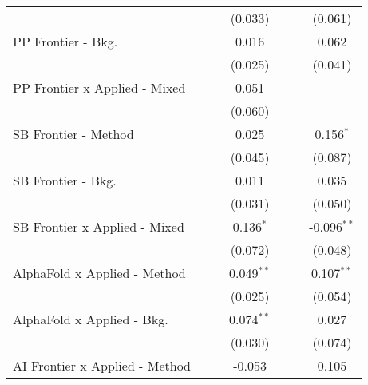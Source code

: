 \begin{tabular}{lcccccc}
                                  &               &               & (0.033)       &               &         & (0.061)\\   
   PP Frontier - Bkg.             &               &               & 0.016         &               &         & 0.062\\   
                                  &               &               & (0.025)       &               &         & (0.041)\\   
   PP Frontier x Applied - Mixed  &               &               & 0.051         &               &         &   \\   
                                  &               &               & (0.060)       &               &         &   \\   
   SB Frontier - Method           &               &               & 0.025         &               &         & 0.156$^{*}$\\   
                                  &               &               & (0.045)       &               &         & (0.087)\\   
   SB Frontier - Bkg.             &               &               & 0.011         &               &         & 0.035\\   
                                  &               &               & (0.031)       &               &         & (0.050)\\   
   SB Frontier x Applied - Mixed  &               &               & 0.136$^{*}$   &               &         & -0.096$^{**}$\\   
                                  &               &               & (0.072)       &               &         & (0.048)\\   
   AlphaFold x Applied - Method   &               &               & 0.049$^{**}$  &               &         & 0.107$^{**}$\\   
                                  &               &               & (0.025)       &               &         & (0.054)\\   
   AlphaFold x Applied - Bkg.     &               &               & 0.074$^{**}$  &               &         & 0.027\\   
                                  &               &               & (0.030)       &               &         & (0.074)\\   
   AI Frontier x Applied - Method &               &               & -0.053        &               &         & 0.105\\   

\end{tabular}

